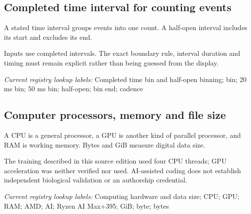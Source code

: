 \begin{samepage}
\subsection*{Completed time interval for counting events}
\noindent A stated time interval groups events into one count. A half-open interval includes its start and excludes its end.\par
\end{samepage}
\begin{samepage}
\noindent Inputs use completed intervals. The exact boundary rule, interval duration and timing must remain explicit rather than being guessed from the display.\par\nopagebreak[4]

\end{samepage}


\noindent\textit{Current registry lookup labels:} Completed time bin and half-open binning; bin; 20 ms bin; 50 ms bin; half-open; bin end; cadence\par

\begin{samepage}
\subsection*{Computer processors, memory and file size}
\noindent A CPU is a general processor, a GPU is another kind of parallel processor, and RAM is working memory. Bytes and GiB measure digital data size.\par
\end{samepage}
\begin{samepage}
\noindent The training described in this source edition used four CPU threads; GPU acceleration was neither verified nor used. AI-assisted coding does not establish independent biological validation or an authorship credential.\par\nopagebreak[4]

\end{samepage}


\noindent\textit{Current registry lookup labels:} Computing hardware and data size; CPU; GPU; RAM; AMD; AI; Ryzen AI Max+395; GiB; byte; bytes\par

